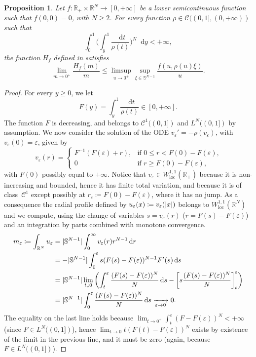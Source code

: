 \documentclass[10pt]{amsart}
\theoremstyle{plain}
\newtheorem{proposition}[theorem]{Proposition}
\theoremstyle{definition}
\newcommand{\dd}{\mathop{}\mathopen{}\mathrm{d}}
\newcommand{\R}{\mathbb{R}}
\newcommand{\Sph}{\mathbb{S}}
\newcommand{\Cspace}{\mathscr{C}}
\newcommand{\loc}{\mathrm{loc}}
\newcommand{\eps}{\varepsilon}
\DeclarePairedDelimiter{\abs}{\lvert}{\rvert}
\newcommand{\xto}[2][]{\xrightarrow[#2]{#1}}
\begin{document}
\begin{proposition}\label{slopeUpperBound}
Let $f:\R_+\times\R^N\to [0,+\infty]$ be a lower semicontinuous function such that $f(0,0)=0$, with $N\geq 2$. For every function \(\rho\in\Cspace((0,1],(0,+\infty))\) such that
\begin{equation}
\label{hypRegularityOriginSlope}
\int_0^1\Big(\int_y^1\frac{\dd t}{\rho(t)}\Big)^N\dd y<+\infty,
\end{equation}
the function $H_f$ defined in  satisfies
\begin{equation}
\label{slopeComparison}
\lim_{m\to 0^+}\frac{H_f(m)}{m}\leq\limsup_{u\to 0^+}\sup_{\xi\in\Sph^{N-1} }\frac{f(u,\rho(u)\xi)}{u}.
\end{equation}
\end{proposition}
\begin{proof}
For every $y\geq 0$, we let
\[
F(y)=\int_y^1\frac{\dd t}{\rho(t)} \in [0,+\infty].
\]
The function $F$ is decreasing, and belongs to $\Cspace^1((0,1])$ and \(L^N((0,1])\) by assumption. We now consider the solution of the ODE \(v_\eps'=-\rho(v_\eps)\), with \(v_\eps(0)=\eps\), given by
\[
v_\eps(r)=
\begin{cases}
F^{-1}(F(\eps)+r),&\text{if \(0\leq r<F(0)-F(\eps)\),}\\
0&\text{if \(r\geq F(0)-F(\eps)\)},
\end{cases}
\]
with $F(0)$ possibly equal to $+\infty$. Notice that $v_\eps \in W^{1,1}_\loc(\R_+)$ because it is non-increasing and bounded, hence it has finite total variation, and because it is of class~$\Cspace^1$ except possibly at $r_\eps \coloneqq F(0)-F(\eps)$, where it has no jump. As a consequence the radial profile defined by \(u_\eps(x)\coloneqq v_\eps(\abs{x})\) belongs to $W^{1,1}_\loc(\R^N)$ and we compute, using the change of variables \(s=v_\eps(r)\) (\ie \(r=F(s)-F(\eps)\)) and an integration by parts combined with monotone convergence.
\begin{align*}
m_\eps\coloneqq\int_{\R^N}u_\eps&=\abs{\Sph^{N-1}}\int_0^\infty v_\eps(r)r^{N-1}\dd r\\
&=-\abs{\Sph^{N-1}}\int_0^\eps s(F(s)-F(\eps))^{N-1}F'(s)\dd s\\
&=\abs{\Sph^{N-1}}\lim_{t\downarrow 0} \left(\int_t^\eps\frac{(F(s)-F(\eps))^N}{N}\dd s- \left[s\frac{(F(s)-F(\eps))^N}N\right]_t^\eps\right)\\
&=\abs{\Sph^{N-1}}\int_0^\eps\frac{(F(s)-F(\eps))^N}{N}\dd s\xto{\eps \to 0}0.
\end{align*}
The equality on the last line holds because $\lim_{t\to 0^+} \int_t^\eps (F-F(\eps))^N < +\infty$ (since $F \in L^N((0,1])$), hence $\lim_{t\to 0} t(F(t)-F(\eps))^N$ exists by existence of the limit in the previous line, and it must be zero (again, because $F \in L^N((0,1])$).


\end{proof}
\end{document}
